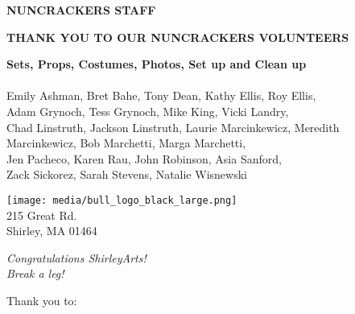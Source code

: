 \documentclass[12pt, a5paper, oneside]{article}
\begin{document}
\begin{center}
\Large \textbf{NUNCRACKERS STAFF}
\end{center}
\raggedright
\begin{center}
    \Large\textbf{THANK YOU TO OUR NUNCRACKERS VOLUNTEERS}\\
\end{center}
\begin{center}
\textbf{Sets, Props, Costumes, Photos, Set up and Clean up}\\
\hfill\\
Emily Ashman, Bret Bahe, Tony Dean, Kathy Ellis, Roy Ellis,\\ Adam Grynoch, Tess Grynoch, Mike King, Vicki Landry,\\ Chad Linstruth, Jackson Linstruth, Laurie Marcinkewicz, Meredith Marcinkewicz, Bob Marchetti, Marga Marchetti,\\ Jen Pacheco, Karen Rau, John Robinson, Asia Sanford,\\ Zack Sickorez, Sarah Stevens, Natalie Wisnewski
\end{center}
\pagebreak
\begin{framed}
\begin{minipage}[c][0.45\textheight]{0.5\linewidth}

    \texttt{[image: media/bull\_logo\_black\_large.png]}\\
\centering
    \small{215 Great Rd.\\
    Shirley, MA 01464}
\end{minipage}
\begin{minipage}[c][0.45\textheight]{0.4\linewidth}

   \Large \textit{Congratulations ShirleyArts!\\
   Break a leg!}
\end{minipage}
\end{framed}
\centering
\begin{framed}
\raggedright Thank you to:
\begin{itemize}
\end{itemize}
\end{framed}	
\end{document}
